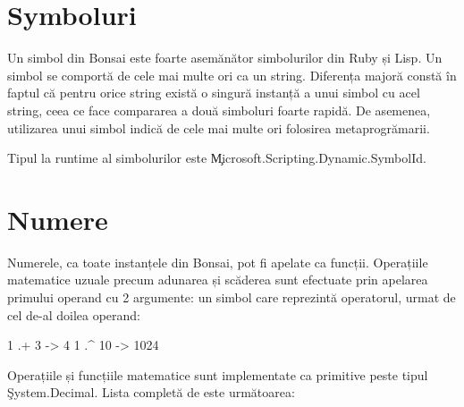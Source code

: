 \documentclass[12pt,a4paper]{memoir}
\begin{document}

\section{Symboluri}\label{sec:Symbols}

Un simbol din Bonsai este foarte asemănător simbolurilor din Ruby\cite{ruby_symbols} și Lisp\cite{clhs_symbols}. Un simbol se comportă de cele mai multe ori ca un string. Diferența majoră constă în faptul că pentru orice string există o singură instanță a unui simbol cu acel string, ceea ce face compararea a două simboluri foarte rapidă. De asemenea, utilizarea unui simbol indică de cele mai multe ori folosirea metaprogrămarii.

Tipul la runtime al simbolurilor este \c{Microsoft.Scripting.Dynamic.SymbolId}.

\section{Numere}

Numerele, ca toate instanțele din Bonsai, pot fi apelate ca funcții. Operațiile matematice uzuale precum adunarea și scăderea sunt efectuate prin apelarea primului operand cu 2 argumente: un simbol care reprezintă operatorul, urmat de cel de-al doilea operand:
\begin{code}
1 .+ 3 -> 4
1 .^ 10 -> 1024
\end{code}

Operațiile și funcțiile matematice sunt implementate ca primitive peste tipul \c{System.Decimal}. Lista completă de este următoarea:
\end{document}
